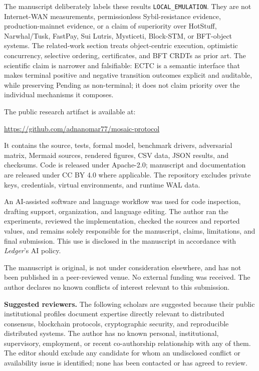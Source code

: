 \documentclass[10pt]{article}
\begin{document}
The manuscript deliberately labels these results \texttt{LOCAL\_EMULATION}. They are not Internet-WAN measurements, permissionless Sybil-resistance evidence, production-mainnet evidence, or a claim of superiority over HotStuff, Narwhal/Tusk, FastPay, Sui Lutris, Mysticeti, Block-STM, or BFT-object systems. The related-work section treats object-centric execution, optimistic concurrency, selective ordering, certificates, and BFT CRDTs as prior art. The scientific claim is narrower and falsifiable: ECTC is a semantic interface that makes terminal positive and negative transition outcomes explicit and auditable, while preserving Pending as non-terminal; it does not claim priority over the individual mechanisms it composes.

The public research artifact is available at:

\url{https://github.com/adnanomar77/mosaic-protocol}

It contains the source, tests, formal model, benchmark drivers, adversarial matrix, Mermaid sources, rendered figures, CSV data, JSON results, and checksums. Code is released under Apache-2.0; manuscript and documentation are released under CC BY 4.0 where applicable. The repository excludes private keys, credentials, virtual environments, and runtime WAL data.

An AI-assisted software and language workflow was used for code inspection, drafting support, organization, and language editing. The author ran the experiments, reviewed the implementation, checked the sources and reported values, and remains solely responsible for the manuscript, claims, limitations, and final submission. This use is disclosed in the manuscript in accordance with \emph{Ledger}'s AI policy.

The manuscript is original, is not under consideration elsewhere, and has not been published in a peer-reviewed venue. No external funding was received. The author declares no known conflicts of interest relevant to this submission.

\textbf{Suggested reviewers.} The following scholars are suggested because their public institutional profiles document expertise directly relevant to distributed consensus, blockchain protocols, cryptographic security, and reproducible distributed systems. The author has no known personal, institutional, supervisory, employment, or recent co-authorship relationship with any of them. The editor should exclude any candidate for whom an undisclosed conflict or availability issue is identified; none has been contacted or has agreed to review.
\end{document}
